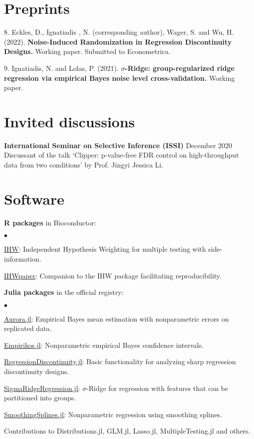\documentclass[margin,line]{res}
\newenvironment{list1}{
  \begin{list}{\ding{113}}{%
      \setlength{\itemsep}{0in}
      \setlength{\parsep}{0in} \setlength{\parskip}{0in}
      \setlength{\topsep}{0in} \setlength{\partopsep}{0in}
      \setlength{\leftmargin}{0.17in}}}{\end{list}}
\newenvironment{list2}{
  \begin{list}{$\bullet$}{%
      \setlength{\itemsep}{0in}
      \setlength{\parsep}{0in} \setlength{\parskip}{0in}
      \setlength{\topsep}{0in} \setlength{\partopsep}{0in}
      \setlength{\leftmargin}{0.2in}}}{\end{list}}
\begin{document}
\begin{resume}
\section{\sc Preprints}
\begin{list1}
\item[8.] Eckles, D., Ignatiadis , N. (corresponding author), Wager, S. and Wu, H. (2022). \textbf{Noise-Induced Randomization in Regression Discontinuity Designs.} Working paper. Submitted to Econometrica.
\item[9.] Ignatiadis, N. and Lolas, P.  (2021). \textbf{$\sigma$-Ridge: group-regularized ridge regression via empirical Bayes noise level cross-validation.} Working paper.
\end{list1}


\section{\sc Invited discussions}
\textbf{International Seminar on Selective Inference (ISSI)} \hfill December 2020\\
Discussant of the talk `Clipper: p-value-free FDR control on high-throughput data from two conditions' 
by Prof. Jingyi Jessica Li.

\section{\sc Software}
{\bf R packages} in Bioconductor:
\begin{list2}
\item \href{https://bioconductor.org/packages/IHW}{{\color{urlblue} IHW}}:  Independent Hypothesis Weighting for multiple testing with side-information.
\item \href{https://bioconductor.org/packages/IHWpaper}{{\color{urlblue} IHWpaper}}: Companion to the IHW package facilitating reproducibility.
\end{list2}
{\bf Julia packages} in the official registry:
\begin{list2}
\item \href{https://github.com/nignatiadis/Aurora.jl}{{\color{urlblue} Aurora.jl}}: Empirical Bayes mean estimation with nonparametric errors on replicated data.
\item \href{https://github.com/nignatiadis/Empirikos.jl}{{\color{urlblue} Empirikos.jl}}: Nonparametric empirical Bayes confidence intervals.
\item \href{https://github.com/nignatiadis/RegressionDiscontinuity.jl}{{\color{urlblue}  RegressionDiscontinuity.jl}}: Basic functionality for analyzing sharp regression discontinuity designs. 
\item \href{https://github.com/nignatiadis/SigmaRidgeRegression.jl}{{\color{urlblue} SigmaRidgeRegression.jl}}: $\sigma$-Ridge for regression with features that can be partitioned into groups.
\item \href{https://github.com/nignatiadis/SmoothingSplines.jl}{{\color{urlblue} SmoothingSplines.jl}}: Nonparametric regression using smoothing splines.
\item Contributions to Distributions.jl, GLM.jl, Lasso.jl, MultipleTesting.jl and others.
\end{list2}



\end{resume}
\end{document}
